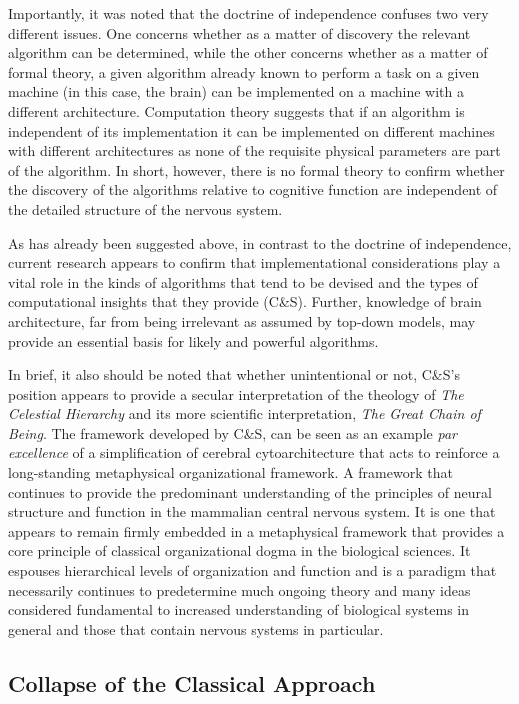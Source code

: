 \documentclass[11pt,3p,twocolumn]{JMN}
\begin{document}
Importantly, it was noted that the doctrine of independence confuses two very different issues. One concerns whether as a matter of discovery the relevant algorithm can be determined, while the other concerns whether as a matter of formal theory, a given algorithm already known to perform a task on a given machine (in this case, the brain) can be implemented on a machine with a different architecture. Computation theory suggests that if an algorithm is independent of its implementation it can be implemented on different machines with different architectures as none of the requisite physical parameters are part of the algorithm. In short, however, there is no formal theory to confirm whether the discovery of the algorithms relative to cognitive function are independent of the detailed structure of the nervous system.

As has already been suggested above, in contrast to the doctrine of independence, current research appears to confirm that implementational considerations play a vital role in the kinds of algorithms that tend to be devised and the types of computational insights that they provide (C\&S). Further, knowledge of brain architecture, far from being irrelevant as assumed by top-down models, may provide an essential basis for likely and powerful algorithms.

In brief, it also should be noted that whether unintentional or not, C\&S's position appears to provide a secular interpretation of the theology of {\it{The Celestial Hierarchy}} and its more scientific interpretation, {\it{The Great Chain of Being}}. The framework developed by C\&S, can be seen as an example {\it{par\,excellence}} of a simplification of cerebral cytoarchitecture that acts to reinforce a long-standing metaphysical organizational framework. A framework that continues to provide the predominant understanding of the principles of neural structure and function in the mammalian central nervous system. It is one that appears to remain firmly embedded in a metaphysical framework that provides a core principle of classical organizational dogma in the biological sciences. It espouses hierarchical levels of organization and function and is a paradigm that necessarily continues to predetermine much ongoing theory and many ideas considered fundamental to increased understanding of biological systems in general and those that contain nervous systems in particular.

\subsection{Collapse of the Classical Approach}
\end{document}
